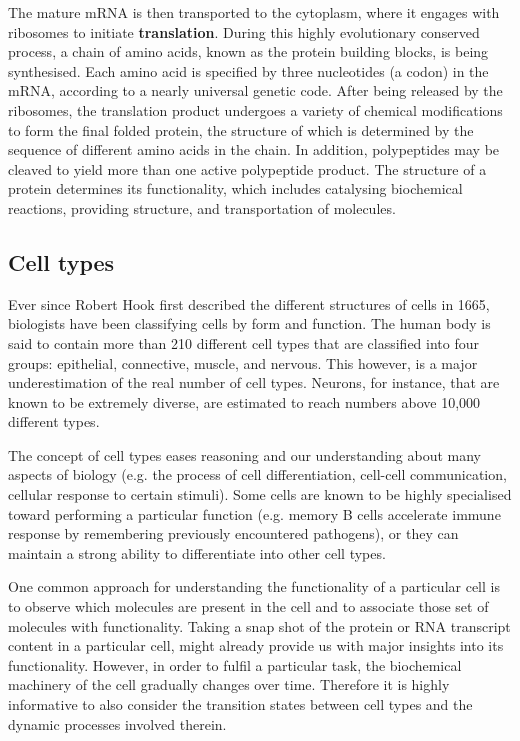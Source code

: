 The mature mRNA is then transported to the cytoplasm, where it engages with ribosomes to initiate \textbf{translation}. During this highly evolutionary conserved process, a chain of amino acids, known as the protein building blocks, is being synthesised. Each amino acid is specified by three nucleotides (a codon) in the mRNA, according to a nearly universal genetic code. After being released by the ribosomes, the translation product undergoes a variety of chemical modifications to form the final folded protein, the structure of which is determined by the sequence of different amino acids in the chain. In addition, polypeptides may be cleaved to yield more than one active polypeptide product. The structure of a protein determines its functionality, which includes catalysing biochemical reactions, providing structure, and transportation of molecules.


\subsection{Cell types}
Ever since Robert Hook first described the different structures of cells in 1665, biologists have been classifying cells by form and function.
The human body is said to contain more than 210 different cell types that are classified into four groups: epithelial, connective, muscle, and nervous. This however, is a major underestimation of the real number of cell types. Neurons, for instance, that are known to be extremely diverse, are estimated to reach numbers above 10,000 different types\cite{strachan_humanmoleculargenetics_2011}.

The concept of cell types eases reasoning and our understanding about many aspects of biology (e.g. the process of cell differentiation, cell-cell communication, cellular response to certain stimuli). Some cells are known to be highly specialised toward performing a particular function (e.g. memory B cells accelerate immune response by remembering previously encountered pathogens), or they can maintain a strong ability to differentiate into other cell types.

One common approach for understanding the functionality of a particular cell is to observe which molecules are present in the cell and to associate those set of molecules with functionality. Taking a snap shot of the protein or RNA transcript content in a particular cell, might already provide us with major insights into its functionality. However, in order to fulfil a particular task, the biochemical machinery of the cell gradually changes over time. Therefore it is highly informative to also consider the transition states between cell types and the dynamic processes involved therein.

